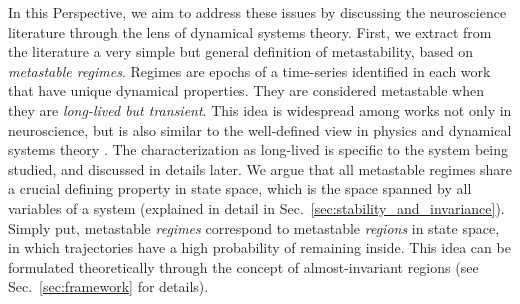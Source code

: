 In this Perspective, we aim to address these issues by discussing the neuroscience literature through the lens of dynamical systems theory. First, we extract from the literature a very simple but general definition of metastability, based on \textit{metastable regimes}. Regimes are epochs of a time-series identified in each work that have unique dynamical properties. They are considered metastable when they are \textit{long-lived but transient}. This idea is widespread among works not only in neuroscience, but is also similar to the well-defined view in physics and dynamical systems theory \cite{olivieri2005large, callen1991thermodynamics, yorke1979metastable}. The characterization as long-lived is specific to the system being studied, and discussed in details later. We argue that all metastable regimes share a crucial defining property in state space, which is the space spanned by all variables of a system (explained in detail in Sec.~\ref{sec:stability_and_invariance}). Simply put, metastable \textit{regimes} correspond to metastable \textit{regions} in state space, in which trajectories have a high probability of remaining inside. This idea can be formulated theoretically through the concept of almost-invariant regions \cite{froyland2005statistically, dellnitz2003congestion} (see Sec.~\ref{sec:framework} for details). 


